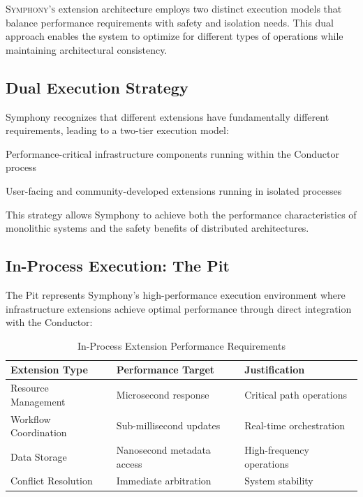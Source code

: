 
\lettrine{S}{ymphony's} extension architecture employs two distinct execution models that balance performance requirements with safety and isolation needs. This dual approach enables the system to optimize for different types of operations while maintaining architectural consistency.

\subsection*{Dual Execution Strategy}

Symphony recognizes that different extensions have fundamentally different requirements, leading to a \textcolor{brandPrimary}{two-tier execution model}:

\begin{description}[leftmargin=4cm,labelwidth=3.5cm]
    \item[\textbf{In-Process Extensions}] Performance-critical infrastructure components running within the Conductor process
    \item[\textbf{Out-of-Process Extensions}] User-facing and community-developed extensions running in isolated processes
\end{description}

This strategy allows Symphony to achieve both the performance characteristics of monolithic systems and the safety benefits of distributed architectures.

\subsection*{In-Process Execution: The Pit}

The Pit represents Symphony's high-performance execution environment where infrastructure extensions achieve optimal performance through direct integration with the Conductor:

\begin{table}[ht]
\centering
\begin{tabular}{@{}lll@{}}
\toprule
\textbf{Extension Type} & \textbf{Performance Target} & \textbf{Justification} \\
\midrule
Resource Management & Microsecond response & Critical path operations \\
Workflow Coordination & Sub-millisecond updates & Real-time orchestration \\
Data Storage & Nanosecond metadata access & High-frequency operations \\
Conflict Resolution & Immediate arbitration & System stability \\
\bottomrule
\end{tabular}
\caption{In-Process Extension Performance Requirements}
\end{table}

